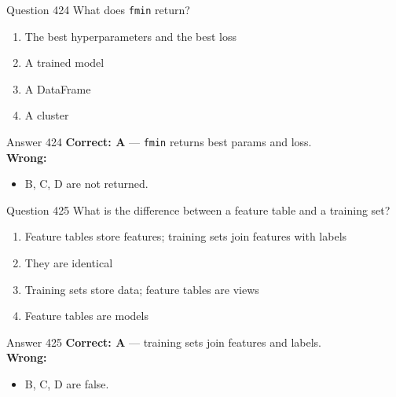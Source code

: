 \documentclass[aspectratio=169,11pt]{beamer}
\begin{document}
	\begin{frame}{Question 424}
		What does \texttt{fmin} return?
		\begin{enumerate}[label=\Alph*.]
			\item The best hyperparameters and the best loss
			\item A trained model
			\item A DataFrame
			\item A cluster
		\end{enumerate}
	\end{frame}
	\begin{frame}{Answer 424}
		\textbf{Correct: A} --- \texttt{fmin} returns best params and loss.\\
		\vspace{0.5em}
		\textbf{Wrong:}
		\begin{itemize}
			\item B, C, D are not returned.
		\end{itemize}
	\end{frame}
	
	\begin{frame}{Question 425}
		What is the difference between a feature table and a training set?
		\begin{enumerate}[label=\Alph*.]
			\item Feature tables store features; training sets join features with labels
			\item They are identical
			\item Training sets store data; feature tables are views
			\item Feature tables are models
		\end{enumerate}
	\end{frame}
	\begin{frame}{Answer 425}
		\textbf{Correct: A} --- training sets join features and labels.\\
		\vspace{0.5em}
		\textbf{Wrong:}
		\begin{itemize}
			\item B, C, D are false.
		\end{itemize}
	\end{frame}
	
\end{document}
